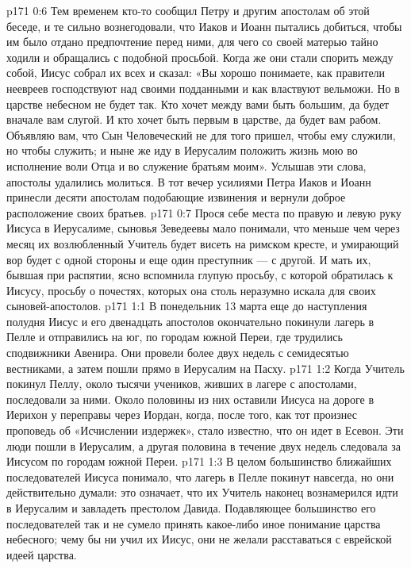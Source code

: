 \vs p171 0:6 Тем временем кто\hyp{}то сообщил Петру и другим апостолам об этой беседе, и те сильно вознегодовали, что Иаков и Иоанн пытались добиться, чтобы им было отдано предпочтение перед ними, для чего со своей матерью тайно ходили и обращались с подобной просьбой. Когда же они стали спорить между собой, Иисус собрал их всех и сказал: «Вы хорошо понимаете, как правители неевреев господствуют над своими подданными и как властвуют вельможи. Но в царстве небесном не будет так. Кто хочет между вами быть большим, да будет вначале вам слугой. И кто хочет быть первым в царстве, да будет вам рабом. Объявляю вам, что Сын Человеческий не для того пришел, чтобы ему служили, но чтобы служить; и ныне же иду в Иерусалим положить жизнь мою во исполнение воли Отца и во служение братьям моим». Услышав эти слова, апостолы удалились молиться. В тот вечер усилиями Петра Иаков и Иоанн принесли десяти апостолам подобающие извинения и вернули доброе расположение своих братьев.
\vs p171 0:7 Прося себе места по правую и левую руку Иисуса в Иерусалиме, сыновья Зеведеевы мало понимали, что меньше чем через месяц их возлюбленный Учитель будет висеть на римском кресте, и умирающий вор будет с одной стороны и еще один преступник --- с другой. И мать их, бывшая при распятии, ясно вспомнила глупую просьбу, с которой обратилась к Иисусу, просьбу о почестях, которых она столь неразумно искала для своих сыновей\hyp{}апостолов.
\vs p171 1:1 В понедельник 13 марта еще до наступления полудня Иисус и его двенадцать апостолов окончательно покинули лагерь в Пелле и отправились на юг, по городам южной Переи, где трудились сподвижники Авенира. Они провели более двух недель с семидесятью вестниками, а затем пошли прямо в Иерусалим на Пасху.
\vs p171 1:2 Когда Учитель покинул Пеллу, около тысячи учеников, живших в лагере с апостолами, последовали за ними. Около половины из них оставили Иисуса на дороге в Иерихон у переправы через Иордан, когда, после того, как тот произнес проповедь об «Исчислении издержек», стало известно, что он идет в Есевон. Эти люди пошли в Иерусалим, а другая половина в течение двух недель следовала за Иисусом по городам южной Переи.
\vs p171 1:3 В целом большинство ближайших последователей Иисуса понимало, что лагерь в Пелле покинут навсегда, но они действительно думали: это означает, что их Учитель наконец вознамерился идти в Иерусалим и завладеть престолом Давида. Подавляющее большинство его последователей так и не сумело принять какое\hyp{}либо иное понимание царства небесного; чему бы ни учил их Иисус, они не желали расставаться с еврейской идеей царства.
